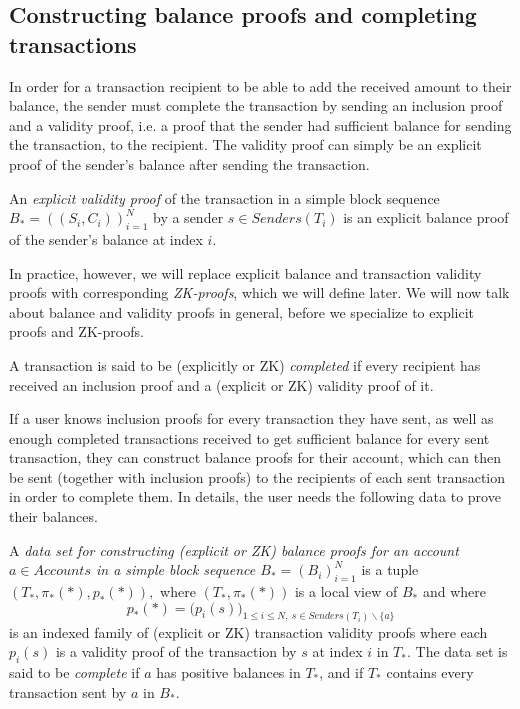 \subsection{Constructing balance proofs and completing transactions}

In order for a transaction recipient to be able to add the received amount to their balance, the sender must complete the transaction by sending an inclusion proof and a validity proof, i.e. a proof that the sender had sufficient balance for sending the transaction, to the recipient. The validity proof can simply be an explicit proof of the sender's balance after sending the transaction.

\begin{defn}
  An \emph{explicit validity proof} of the transaction in a simple block sequence \(B_* = ((S_i,C_i))_{i=1}^N\) by a sender \(s \in Senders(T_i)\) is an explicit balance proof of the sender's balance at index \(i\).
\end{defn}

In practice, however, we will replace explicit balance and transaction validity proofs with corresponding \emph{ZK-proofs}, which we will define later. We will now talk about balance and validity proofs in general, before we specialize to explicit proofs and ZK-proofs.

\begin{defn}
  A transaction is said to be (explicitly or ZK) \emph{completed} if every recipient has received an inclusion proof and a (explicit or ZK) validity proof of it.
\end{defn}

If a user knows inclusion proofs for every transaction they have sent, as well as enough completed transactions received to get sufficient balance for every sent transaction, they can construct balance proofs for their account, which can then be sent (together with inclusion proofs) to the recipients of each sent transaction in order to complete them. In details, the user needs the following data to prove their balances.

\begin{defn}
   A \emph{data set for constructing (explicit or ZK) balance proofs for an account \(a \in Accounts\) in a simple block sequence \(B_* = (B_i)_{i=1}^N\)} is a tuple \((T_*,\pi_*(*), p_*(*)),\) where \((T_*,\pi_*(*))\) is a local view of \(B_*\) and where \[p_*(*) = \bigl(p_i(s)\bigr)_{1 \leq i \leq N,\ s \in Senders(T_i) \backslash \{a\}}\] is an indexed family of (explicit or ZK) transaction validity proofs where each \(p_i(s)\) is a validity proof of the transaction by \(s\) at index \(i\) in \(T_*\). The data set is said to be \emph{complete} if \(a\) has positive balances in \(T_*\), and if \(T_*\) contains every transaction sent by \(a\) in \(B_*\).
\end{defn}

